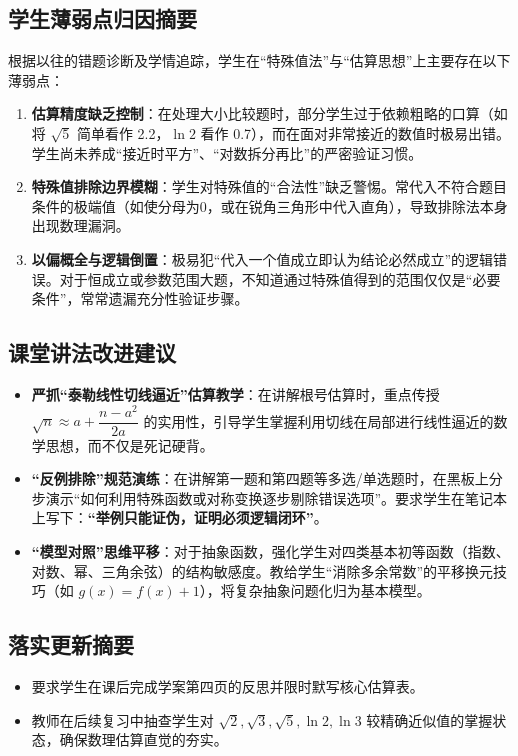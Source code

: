 \documentclass[12pt,a4paper]{ctexart}
\begin{document}
\subsection{学生薄弱点归因摘要}
根据以往的错题诊断及学情追踪，学生在“特殊值法”与“估算思想”上主要存在以下薄弱点：
\begin{enumerate}[label=\arabic*. , leftmargin=2em, itemsep=0.1em, topsep=0.2em]
  \item \textbf{估算精度缺乏控制}：在处理大小比较题时，部分学生过于依赖粗略的口算（如将 \(\sqrt{5}\) 简单看作 2.2，\(\ln 2\) 看作 0.7），而在面对非常接近的数值时极易出错。学生尚未养成“接近时平方”、“对数拆分再比”的严密验证习惯。
  \item \textbf{特殊值排除边界模糊}：学生对特殊值的“合法性”缺乏警惕。常代入不符合题目条件的极端值（如使分母为0，或在锐角三角形中代入直角），导致排除法本身出现数理漏洞。
  \item \textbf{以偏概全与逻辑倒置}：极易犯“代入一个值成立即认为结论必然成立”的逻辑错误。对于恒成立或参数范围大题，不知道通过特殊值得到的范围仅仅是“必要条件”，常常遗漏充分性验证步骤。
\end{enumerate}

\subsection{课堂讲法改进建议}
\begin{itemize}[leftmargin=2em, itemsep=0.1em, topsep=0.2em]
  \item \textbf{严抓“泰勒线性切线逼近”估算教学}：在讲解根号估算时，重点传授 \(\sqrt{n} \approx a + \dfrac{n-a^2}{2a}\) 的实用性，引导学生掌握利用切线在局部进行线性逼近的数学思想，而不仅是死记硬背。
  \item \textbf{“反例排除”规范演练}：在讲解第一题和第四题等多选/单选题时，在黑板上分步演示“如何利用特殊函数或对称变换逐步剔除错误选项”。要求学生在笔记本上写下：\textbf{“举例只能证伪，证明必须逻辑闭环”}。
  \item \textbf{“模型对照”思维平移}：对于抽象函数，强化学生对四类基本初等函数（指数、对数、幂、三角余弦）的结构敏感度。教给学生“消除多余常数”的平移换元技巧（如 \(g(x)=f(x)+1\)），将复杂抽象问题化归为基本模型。
\end{itemize}

\subsection{落实更新摘要}
\begin{itemize}[leftmargin=2em, itemsep=0.1em, topsep=0.2em]
  \item 要求学生在课后完成学案第四页的反思并限时默写核心估算表。
  \item 教师在后续复习中抽查学生对 \(\sqrt{2},\sqrt{3},\sqrt{5},\ln 2,\ln 3\) 较精确近似值的掌握状态，确保数理估算直觉的夯实。
\end{itemize}

\endgroup
\end{document}
